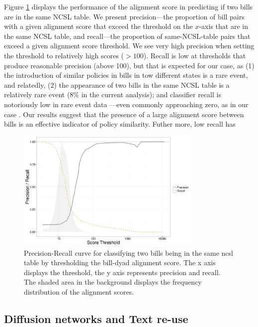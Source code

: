 \documentclass[12pt]{article} %
\begin{document}
Figure \ref{fig:ncsl_prec_rec} displays the performance of the alignment score
in predicting if two bills are in the same NCSL table. We present
precision---the proportion of bill pairs with a given alignment score that
exceed the threshold on the $x$-axis that are in the same NCSL table, and
recall---the proportion of same-NCSL-table pairs that exceed a given alignment
score threshold. We see very high precision when setting the threshold to
relatively high scores ($>100$). Recall is low at thresholds that produce
reasonable precision (above 100), but that is expected for our case, as
(1) the introduction of similar policies in bills in tow different states is a
rare event, and relatedly, (2) the appearance of two bills in the same NCSL
table is a relatively rare event (8\% in the current analysis); and classifier
recall is notoriously low in rare event data \citep{weiss2000learning}---even
commonly approaching zero, as in our case \citep{weiss2004mining}. Our results
suggest that the presence of a large alignment score between bills is an
effective indicator of policy similarity. Futher more, low recall has



\begin{figure}
\centering
\includegraphics[width=0.8\textwidth]{figures/ncsl_pr_nosplit.png}
\caption{Precision-Recall curve for classifying two bills being in the same
    ncsl table by thresholding the bill-dyad alignment score. The x axis
displays the threshold, the y axis represents precision and recall. The shaded
area in the background displays the frequency distribution of the alignment
scores.}
\label{fig:ncsl_prec_rec}
\end{figure}


\subsection{Diffusion networks and Text re-use}
\end{document}
